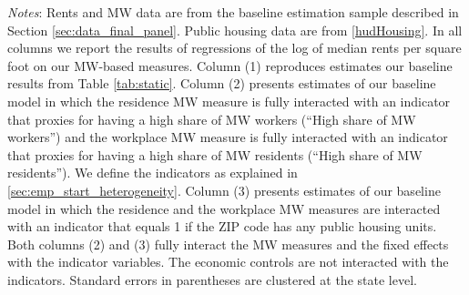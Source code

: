 \begin{table}[hbt!]
    \begin{minipage}{.95\textwidth} \footnotesize
        \vspace{2mm}
        \textit{Notes}: 
        Rents and MW data are from the baseline estimation sample described in Section 
        \ref{sec:data_final_panel}.
        Public housing data are from \ref{hudHousing}.
        In all columns we report the results of regressions of the log of median rents 
        per square foot on our MW-based measures.
        Column (1) reproduces estimates our baseline results from Table \ref{tab:static}.
        Column (2) presents estimates of our baseline model in which the residence MW 
        measure is fully interacted with an indicator that proxies for having a high share 
        of MW workers (``High share of MW workers'') and the workplace MW measure is 
        fully interacted with an indicator that proxies for having a high share of MW 
        residents (``High share of MW residents'').
        We define the indicators as explained in \ref{sec:emp_start_heterogeneity}.
        Column (3) presents estimates of our baseline model in which the residence and 
        the workplace MW measures are interacted with an indicator that equals 1 if 
        the ZIP code has any public housing units.
        Both columns (2) and (3) fully interact the MW measures and the fixed effects
        with the indicator variables. The economic controls are not interacted with 
        the indicators.
        Standard errors in parentheses are clustered at the state level.
    \end{minipage}
\end{table}
